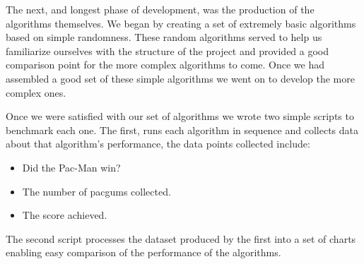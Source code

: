 \documentclass[12pt]{article}
\begin{document}
    The next, and longest phase of development, was the production of the algorithms themselves. We began by creating a set of extremely basic algorithms based on simple randomness. These random algorithms served to help us familiarize ourselves with the structure of the project and provided a good comparison point for the more complex algorithms to come. Once we had assembled a good set of these simple algorithms we went on to develop the more complex ones.

    Once we were satisfied with our set of algorithms we wrote two simple scripts to benchmark each one. The first, runs each algorithm in sequence and collects data about that algorithm's performance, the data points collected include:
    \begin{itemize}
      \itemsep0pt
      \item Did the Pac-Man win?
      \item The number of pacgums collected.
      \item The score achieved.
    \end{itemize}
    The second script processes the dataset produced by the first into a set of charts enabling easy comparison of the performance of the algorithms.
\end{document}
